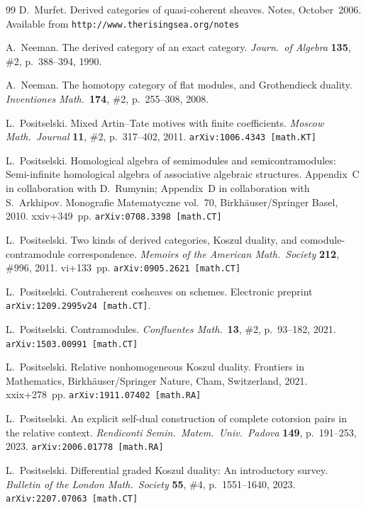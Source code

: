 \documentclass[12pt,a4paper]{amsart}
\newcommand{\+}{\nobreakdash-}
\renewcommand{\:}{\colon}
\theoremstyle{plain}
\theoremstyle{definition}
\begin{document}
\begin{thebibliography}{99}
 D.~Murfet.
   Derived categories of quasi-coherent sheaves.
Notes, October~2006.
Available from \texttt{http://www.therisingsea.org/notes}

 A.~Neeman.
   The derived category of an exact category.
\textit{Journ.\ of Algebra} \textbf{135}, \#2, p.~388--394, 1990.

 A.~Neeman.
   The homotopy category of flat modules, and Grothendieck duality.
\textit{Inventiones Math.}\ \textbf{174}, \#2, p.~255--308, 2008.

 L.~Positselski.
   Mixed Artin--Tate motives with finite coefficients.
\textit{Moscow Math.\ Journal} \textbf{11}, \#2, p.~317--402, 2011.
\texttt{arXiv:1006.4343 [math.KT]}

 L.~Positselski.
   Homological algebra of semimodules and semicontramodules:
Semi-infinite homological algebra of associative algebraic structures.
 Appendix~C in collaboration with D.~Rumynin; Appendix~D in
collaboration with S.~Arkhipov.
 Monografie Matematyczne vol.~70, Birkh\"auser/Springer Basel, 2010. 
xxiv+349~pp. \texttt{arXiv:0708.3398 [math.CT]}

 L.~Positselski.
   Two kinds of derived categories, Koszul duality, and
comodule-contramodule correspondence.
\textit{Memoirs of the American Math.\ Society} \textbf{212},
\#996, 2011.  vi+133~pp.  \texttt{arXiv:0905.2621 [math.CT]}

 L.~Positselski.
   Contraherent cosheaves on schemes.
Electronic preprint \texttt{arXiv:1209.2995v24 [math.CT]}.

 L.~Positselski.
   Contramodules.
\textit{Confluentes Math.}\ \textbf{13}, \#2, p.~93--182, 2021.
\texttt{arXiv:1503.00991 [math.CT]}

 L.~Positselski.
   Relative nonhomogeneous Koszul duality.
Frontiers in Mathematics, Birkh\"auser/Springer Nature, Cham,
Switzerland, 2021.  xxix+278~pp.  \texttt{arXiv:1911.07402 [math.RA]}
{\par}

 L.~Positselski.
   An explicit self-dual construction of complete cotorsion pairs
in the relative context.
\textit{Rendiconti Semin.\ Matem.\ Univ.\ Padova} \textbf{149},
p.~191--253, 2023.  \texttt{arXiv:2006.01778 [math.RA]}

 L.~Positselski.
   Differential graded Koszul duality: An introductory survey.
\textit{Bulletin of the London Math.\ Society} \textbf{55}, \#4,
p.~1551--1640, 2023.  \texttt{arXiv:2207.07063 [math.CT]}


\end{thebibliography}
\end{document}
